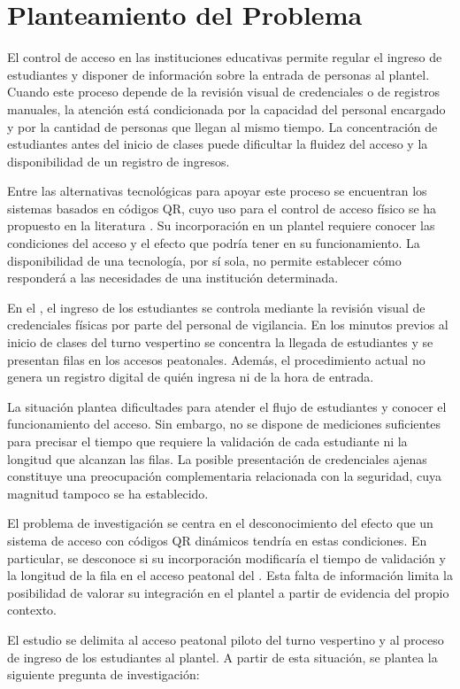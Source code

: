 \section{Planteamiento del Problema}
El control de acceso en las instituciones educativas permite regular el
ingreso de estudiantes y disponer de información sobre la entrada de personas
al plantel. Cuando este proceso depende de la revisión visual de credenciales
o de registros manuales, la atención está condicionada por la capacidad del
personal encargado y por la cantidad de personas que llegan al mismo tiempo.
La concentración de estudiantes antes del inicio de clases puede dificultar
la fluidez del acceso y la disponibilidad de un registro de ingresos.

Entre las alternativas tecnológicas para apoyar este proceso se encuentran
los sistemas basados en códigos QR, cuyo uso para el control de acceso físico
se ha propuesto en la literatura \parencite{kao2011physical}. Su incorporación
en un plantel requiere conocer las condiciones del acceso y el efecto que
podría tener en su funcionamiento. La disponibilidad de una tecnología, por
sí sola, no permite establecer cómo responderá a las necesidades de una
institución determinada.

En el \tescha{}, el ingreso de los
estudiantes se controla mediante la revisión visual de credenciales físicas
por parte del personal de vigilancia. En los minutos previos al inicio de
clases del turno vespertino se concentra la llegada de estudiantes y se
presentan filas en los accesos peatonales. Además, el procedimiento actual
no genera un registro digital de quién ingresa ni de la hora de entrada.

La situación plantea dificultades para atender el flujo de estudiantes y
conocer el funcionamiento del acceso. Sin embargo, no se dispone de
mediciones suficientes para precisar el tiempo que requiere la validación
de cada estudiante ni la longitud que alcanzan las filas. La posible
presentación de credenciales ajenas constituye una preocupación
complementaria relacionada con la seguridad, cuya magnitud tampoco se ha
establecido.

El problema de investigación se centra en el desconocimiento del efecto que
un sistema de acceso con códigos QR dinámicos tendría en estas condiciones.
En particular, se desconoce si su incorporación modificaría el tiempo de
validación y la longitud de la fila en el acceso peatonal del \tescha{}. Esta
falta de información limita la posibilidad de valorar su integración en el
plantel a partir de evidencia del propio contexto.

El estudio se delimita al acceso peatonal piloto del turno vespertino y al
proceso de ingreso de los estudiantes al plantel. A partir de esta situación,
se plantea la siguiente pregunta de investigación:


